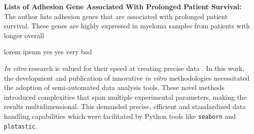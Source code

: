 \textbf{Lists of Adhesion Gene Associated With Prolonged Patient Survival:}
The author lists adhesion genes that are associated with prolonged patient
survival. These genes are highly expressed in myeloma samples from patients with
longer overall



%
\label{sec:discussion_conclusion_cancer}%

lorem ipsum yes yes very bad









%
\label{sec:discussion_semi_automated_analysis}%
\textit{In vitro} research is valued for their speed at creating precise data
\cite{moleiroCriticalAnalysisAvailable2017}. In this work, the development and
publication of innovative \textit{in vitro} methodologies necessitated the adoption of
semi-automated data analysis tools. These novel methods introduced complexities
that span multiple experimental parameters, making the results multidimensional.
This demanded precise, efficient and standardized data handling capabilities
which were facilitated by Python tools like \texttt{seaborn} and
\texttt{plotastic}.


